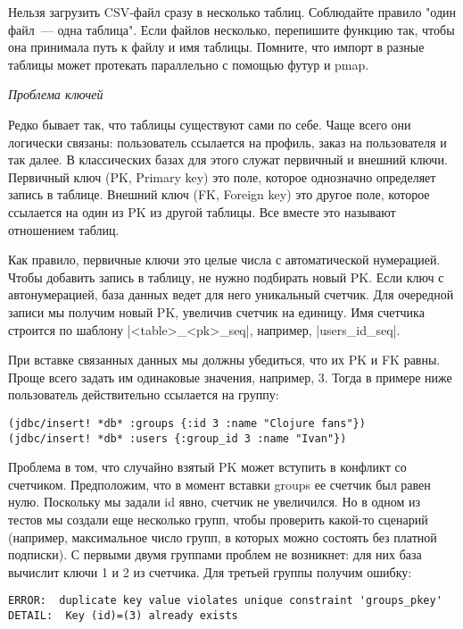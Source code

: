 Нельзя загрузить CSV-файл сразу в несколько таблиц. Соблюдайте правило "один
файл~--- одна таблица". Если файлов несколько, перепишите функцию так, чтобы она
принимала путь к файлу и имя таблицы. Помните, что импорт в разные таблицы может
протекать параллельно с помощью футур и pmap.

\emph{Проблема ключей}

Редко бывает так, что таблицы существуют сами по себе. Чаще всего они логически
связаны: пользователь ссылается на профиль, заказ на пользователя и так далее. В
классических базах для этого служат первичный и внешний ключи. Первичный ключ
(PK, Primary key) это поле, которое однозначно определяет запись в
таблице. Внешний ключ (FK, Foreign key) это другое поле, которое ссылается на
один из PK из другой таблицы. Все вместе это называют отношением таблиц.

Как правило, первичные ключи это целые числа с автоматической нумерацией. Чтобы
добавить запись в таблицу, не нужно подбирать новый PK. Если ключ с
автонумерацией, база данных ведет для него уникальный счетчик. Для очередной
записи мы получим новый PK, увеличив счетчик на единицу. Имя счетчика строится
по шаблону \spverb|<table>_<pk>_seq|, например, \spverb|users_id_seq|.

При вставке связанных данных мы должны убедиться, что их PK и FK равны. Проще
всего задать им одинаковые значения, например, 3. Тогда в примере ниже
пользователь действительно ссылается на группу:

\begin{verbatim}
(jdbc/insert! *db* :groups {:id 3 :name "Clojure fans"})
(jdbc/insert! *db* :users {:group_id 3 :name "Ivan"})
\end{verbatim}

Проблема в том, что случайно взятый PK может вступить в конфликт со
счетчиком. Предположим, что в момент вставки groups ее счетчик был равен
нулю. Поскольку мы задали id явно, счетчик не увеличился. Но в одном из тестов
мы создали еще несколько групп, чтобы проверить какой-то сценарий (например,
максимальное число групп, в которых можно состоять без платной подписки). С
первыми двумя группами проблем не возникнет: для них база вычислит ключи 1 и 2
из счетчика. Для третьей группы получим ошибку:

\begin{verbatim}
ERROR:  duplicate key value violates unique constraint 'groups_pkey'
DETAIL:  Key (id)=(3) already exists
\end{verbatim}

